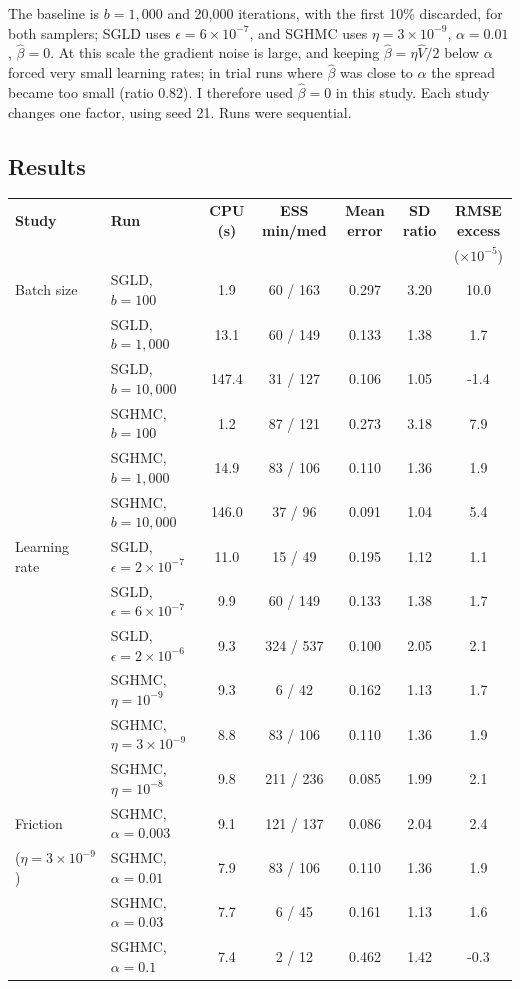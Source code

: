 \documentclass[11pt]{article}
\begin{document}
The baseline is $b=1{,}000$ and 20,000 iterations, with the first 10\% discarded, for both samplers; SGLD uses
$\epsilon=6\times10^{-7}$, and SGHMC uses $\eta=3\times10^{-9}$, $\alpha=0.01$, $\hat\beta=0$. At this scale
the gradient noise is large, and keeping $\hat\beta=\eta\hat V/2$ below $\alpha$ forced very small learning
rates; in trial runs where $\hat\beta$ was close to $\alpha$ the spread became too small (ratio 0.82). I
therefore used $\hat\beta=0$ in this study. Each study changes one factor, using seed 21. Runs were
sequential.

\subsection*{Results}

\begin{center}
\small
\setlength{\tabcolsep}{2.5pt}
\begin{tabular}{llccccc}
\toprule
\textbf{Study} & \textbf{Run} & \textbf{CPU (s)} & \textbf{ESS min/med} & \textbf{Mean error} & \textbf{SD ratio} & \textbf{RMSE excess} \\
 & & & & & & ($\times10^{-5}$) \\
\midrule
Batch size & SGLD, $b=100$ & 1.9 & 60 / 163 & 0.297 & 3.20 & 10.0 \\
 & SGLD, $b=1{,}000$ & 13.1 & 60 / 149 & 0.133 & 1.38 & 1.7 \\
 & SGLD, $b=10{,}000$ & 147.4 & 31 / 127 & 0.106 & 1.05 & -1.4 \\
 & SGHMC, $b=100$ & 1.2 & 87 / 121 & 0.273 & 3.18 & 7.9 \\
 & SGHMC, $b=1{,}000$ & 14.9 & 83 / 106 & 0.110 & 1.36 & 1.9 \\
 & SGHMC, $b=10{,}000$ & 146.0 & 37 / 96 & 0.091 & 1.04 & 5.4 \\
\midrule
Learning rate & SGLD, $\epsilon=2\times10^{-7}$ & 11.0 & 15 / 49 & 0.195 & 1.12 & 1.1 \\
 & SGLD, $\epsilon=6\times10^{-7}$ & 9.9 & 60 / 149 & 0.133 & 1.38 & 1.7 \\
 & SGLD, $\epsilon=2\times10^{-6}$ & 9.3 & 324 / 537 & 0.100 & 2.05 & 2.1 \\
 & SGHMC, $\eta=10^{-9}$ & 9.3 & 6 / 42 & 0.162 & 1.13 & 1.7 \\
 & SGHMC, $\eta=3\times10^{-9}$ & 8.8 & 83 / 106 & 0.110 & 1.36 & 1.9 \\
 & SGHMC, $\eta=10^{-8}$ & 9.8 & 211 / 236 & 0.085 & 1.99 & 2.1 \\
\midrule
Friction & SGHMC, $\alpha=0.003$ & 9.1 & 121 / 137 & 0.086 & 2.04 & 2.4 \\
($\eta=3\times10^{-9}$) & SGHMC, $\alpha=0.01$ & 7.9 & 83 / 106 & 0.110 & 1.36 & 1.9 \\
 & SGHMC, $\alpha=0.03$ & 7.7 & 6 / 45 & 0.161 & 1.13 & 1.6 \\
 & SGHMC, $\alpha=0.1$ & 7.4 & 2 / 12 & 0.462 & 1.42 & -0.3 \\
\bottomrule
\end{tabular}
\end{center}
\end{document}
